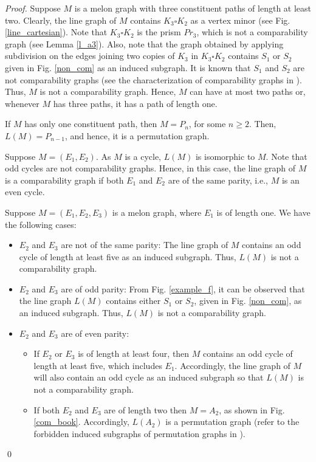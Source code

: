 \documentclass{llncs}
\begin{document}
\begin{proof}
	Suppose $M$ is a melon graph with three constituent paths of length at least two. Clearly, the line graph of $M$ contains $K_3 \square K_2$ as a vertex minor (see Fig. \ref{line_cartesian}). Note that $K_3 \square K_2$ is the prism $Pr_3$, which is not a comparability graph (see Lemma \ref{l_a3}). Also, note that the graph obtained by applying subdivision on the edges joining two copies of $K_3$ in  $K_3 \square K_2$ contains $S_1$ or $S_2$ given in Fig. \ref{non_com} as an induced subgraph. It is known that $S_1$ and  $S_2$ are not comparability graphs (see the characterization of comparability graphs in \cite{Gallai}). Thus, $M$ is not a comparability graph. Hence, $M$ can have at most two paths or, whenever $M$ has three paths, it has a path of length one. 
	
	If $M$ has only one constituent path, then $M = P_n$, for some $n \ge 2$. Then, $L(M) = P_{n-1}$, and hence, it is a permutation graph. 
	
	Suppose $M = (E_1, E_2)$. As $M$ is a cycle, $L(M)$ is isomorphic to $M$. Note that odd cycles are not comparability graphs. Hence, in this case, the line graph of $M$ is a comparability graph if both $E_1$ and $E_2$ are of the same parity, i.e., $M$ is an even cycle.
	
	Suppose $M = (E_1, E_2, E_3)$ is a melon graph, where $E_1$ is of length one. We have the following cases:
	\begin{itemize}
		\item $E_2$ and $E_3$ are not of the same parity: The line graph of $M$ contains an odd cycle of length at least five as an induced subgraph. Thus, $L(M)$ is not a comparability graph.		
		\item $E_2$ and $E_3$ are of odd parity: From Fig.  \ref{example_f}, it can be observed that the line graph $L(M)$ contains either $S_1$ or $S_2$, given in Fig. \ref{non_com}, as an induced subgraph. Thus, $L(M)$ is not a comparability graph.	
		\item $E_2$ and $E_3$ are of even parity: 
		\begin{itemize}
			\item[-] If $E_2$ or $E_3$ is of length at least four, then $M$ contains an odd cycle of length at least five, which includes $E_1$. Accordingly, the line graph of $M$ will also contain an odd cycle as an induced subgraph so that $L(M)$ is not a comparability graph.			
			\item[-] If both $E_2$ and $E_3$ are of length two then $M = A_2$, as shown in Fig. \ref{com_book}. Accordingly, $L(A_2)$ is a permutation graph (refer to the forbidden induced subgraphs of permutation graphs in \cite{Gallai}).
		\end{itemize}
	\end{itemize}
	\qed
\end{proof}
\end{document}
